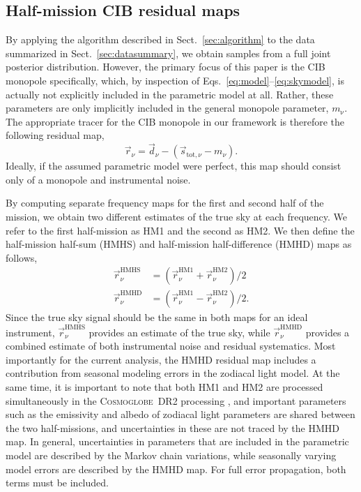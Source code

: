 \documentclass{aa}
\newcommand{\dv}[0]{\vec{d}}
\newcommand{\s}[0]{\vec{s}}
\renewcommand{\r}[0]{\vec{r}}
\newcommand{\cosmoglobe}{\textsc{Cosmoglobe}}
\begin{document}
\subsection{Half-mission CIB residual maps}

By applying the algorithm described in Sect.~\ref{sec:algorithm} to
the data summarized in Sect.~\ref{sec:datasummary}, we obtain samples
from a full joint posterior distribution. However, the primary focus
of this paper is the CIB monopole specifically, which, by inspection
of Eqs.~\eqref{eq:model}--\eqref{eq:skymodel}, is actually not
explicitly included in the parametric model at all. Rather, these
parameters are only implicitly included in the general monopole
parameter, $m_{\mathrm{\nu}}$. The appropriate tracer for the CIB
monopole in our framework is therefore the following residual map,
\begin{equation}
\r_{\nu} = \dv_{\nu} - \left(\s_{\mathrm{tot},\nu} - m_{\nu}\right).
\end{equation}
Ideally, if the assumed parametric model were perfect, this map should
consist only of a monopole and instrumental noise.

By computing separate
frequency maps for the first and second half of the mission, we obtain
two different estimates of the true sky at each frequency. We
refer to the first half-mission as HM1 and the second as HM2. We then
define the half-mission half-sum (HMHS) and half-mission
half-difference (HMHD) maps as follows,
\begin{align}
\r_{\nu}^{\mathrm{HMHS}} &= (\r_{\nu}^{\mathrm{HM1}} + \r_{\nu}^{\mathrm{HM2}})/2\\
\r_{\nu}^{\mathrm{HMHD}} &= (\r_{\nu}^{\mathrm{HM1}} -
\r_{\nu}^{\mathrm{HM2}})/2.
\end{align}
Since the true sky signal should be the same in both maps for an ideal
instrument, $\r_{\nu}^{\mathrm{HMHS}}$ provides an estimate of the
true sky, while $\r_{\nu}^{\mathrm{HMHD}}$ provides a combined
estimate of both instrumental noise and residual systematics. Most
importantly for the current analysis, the HMHD residual map includes a
contribution from seasonal modeling errors in the zodiacal light
model. At the same time, it is important to note that both HM1 and HM2
are processed simultaneously in the \cosmoglobe\ DR2 processing
\citep{CG02_01}, and important parameters such as the emissivity and
albedo of zodiacal light parameters are shared between the two
half-missions, and uncertainties in these are not traced by the HMHD
map. In general, uncertainties in parameters that are included in the
parametric model are described by the Markov chain variations, while
seasonally varying model errors are described by the HMHD map. For
full error propagation, both terms must be included.
\end{document}
